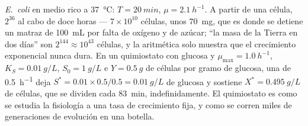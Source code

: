 \begin{example}\label{ex:b3:bacteriology:numbers}
\emph{E.~coli} en medio rico a \qty{37}{\celsius}: $T = \qty{20}{min}$,
$\mu = \qty{2.1}{h^{-1}}$. A partir de una célula, $2^{36}$ al cabo de
doce horas --- $7\times 10^{10}$ células, unos \qty{70}{mg}, que es donde
se detiene un matraz de \qty{100}{mL} por falta de oxígeno y de azúcar;
``la masa de la Tierra en dos días'' son $2^{144}\approx 10^{43}$
células, y la aritmética solo muestra que el crecimiento exponencial
nunca dura. En un quimiostato con glucosa y
$\mu_{\max} = \qty{1.0}{h^{-1}}$, $K_{S} =
\qty{0.01}{g/L}$, $S_{0} = \qty{1}{g/L}$ e $Y = \qty{0.5}{g}$ de células
por gramo de glucosa, una  de \qty{0.5}{h^{-1}} deja $S^{*}
= 0.01\times 0.5/0.5 = \qty{0.01}{g/L}$ de glucosa y sostiene $X^{*} =
\qty{0.495}{g/L}$ de células, que se dividen cada \qty{83}{min},
indefinidamente. El quimiostato es como se estudia la fisiología a una
tasa de crecimiento fija, y como se corren miles de generaciones de
evolución en una botella.
\end{example}

